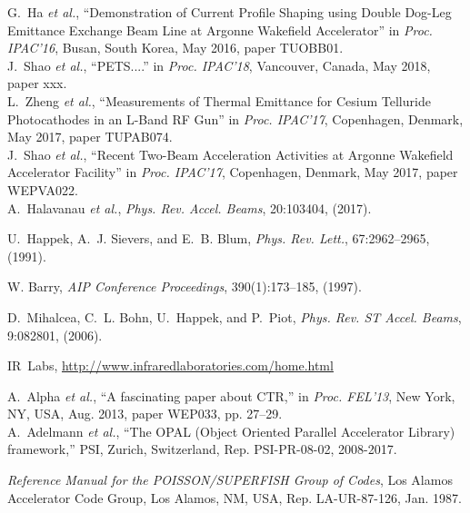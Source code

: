 \documentclass[letterpaper,  %
              ]{jacow-2_3}   %
\begin{document}
\begin{thebibliography}{9}
G.~Ha \emph{et al.}, “Demonstration of Current Profile 
Shaping using Double Dog-Leg Emittance Exchange Beam 
Line at Argonne Wakefield Accelerator”
in \textit{Proc. IPAC’16}, 
Busan, South Korea, May 2016, 
paper TUOBB01.\\

J.~Shao \emph{et al.}, “PETS....”
in \textit{Proc. IPAC’18}, 
Vancouver, Canada, May 2018, 
paper xxx.\\

L.~Zheng \emph{et al.}, “Measurements of Thermal Emittance 
for Cesium Telluride Photocathodes in an L-Band RF Gun”
in \textit{Proc. IPAC’17}, 
Copenhagen, Denmark, May 2017, 
paper TUPAB074.\\

J.~Shao \emph{et al.}, “Recent Two-Beam 
Acceleration Activities at Argonne Wakefield Accelerator Facility”
in \textit{Proc. IPAC’17}, 
Copenhagen, Denmark, May 2017, 
paper WEPVA022.\\

A.~Halavanau \textit{et al.},
\newblock \emph{Phys. Rev. Accel. Beams}, 20:103404, (2017).

U.~Happek, A.~J. Sievers, and E.~B. Blum,
\newblock \emph{Phys. Rev. Lett.}, 67:2962--2965, (1991).

W. Barry,
\newblock \emph{AIP Conference Proceedings}, 390(1):173--185, (1997).

D.~Mihalcea, C.~L. Bohn, U.~Happek, and P.~Piot,
\newblock \emph{Phys. Rev. ST Accel. Beams}, 9:082801, (2006).

IR~Labs,
\newblock \url{http://www.infraredlaboratories.com/home.html}

A.~Alpha \emph{et al.}, 
“A fascinating paper about CTR,”
in \emph{Proc. FEL’13}, 
New York, NY, USA, Aug. 2013, 
paper WEP033, pp. 27--29.\\

A.~Adelmann \emph{et al.},
“The OPAL (Object Oriented Parallel Accelerator Library) framework,”
PSI, Zurich, Switzerland,
Rep. PSI-PR-08-02, 2008-2017.

\emph{Reference Manual for the POISSON/SUPERFISH Group of 
	Codes},  Los Alamos Accelerator Code Group,  
 Los Alamos, NM, USA, 
 Rep. LA-UR-87-126, Jan. 1987.
\end{thebibliography}



\null  %
\end{document}

